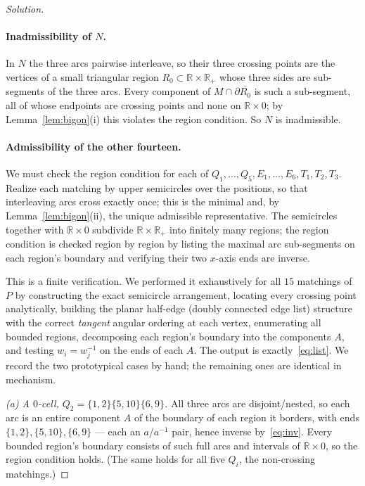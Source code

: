 \documentclass{amsart}
\theoremstyle{definition}
\newcommand{\RR}{\mathbb{R}}
\newcommand{\bdy}{\partial}
\begin{document}
\begin{proof}[Solution]
\paragraph{Inadmissibility of $N$.}
In $N$ the three arcs pairwise interleave, so their three crossing points are the vertices of
a small triangular region $R_0\subset\RR\times\RR_+$ whose three sides are sub-segments of the
three arcs. Every component of $M\cap\bdy\overline{R_0}$ is such a sub-segment, all of whose
endpoints are crossing points and none on $\RR\times0$; by Lemma~\ref{lem:bigon}(i) this
violates the region condition. So $N$ is inadmissible.

\paragraph{Admissibility of the other fourteen.}
We must check the region condition for each of $Q_1,\dots,Q_5,E_1,\dots,E_6,T_1,T_2,T_3$.
Realize each matching by upper semicircles over the positions, so that interleaving arcs cross
exactly once; this is the minimal and, by Lemma~\ref{lem:bigon}(ii), the unique admissible
representative. The semicircles together with $\RR\times0$ subdivide $\RR\times\RR_+$ into
finitely many regions; the region condition is checked region by region by listing the maximal
arc sub-segments on each region's boundary and verifying their two $x$-axis ends are inverse.

This is a finite verification. We performed it exhaustively for all $15$ matchings of $P$ by
constructing the exact semicircle arrangement, locating every crossing point analytically,
building the planar half-edge (doubly connected edge list) structure with the correct
\emph{tangent} angular ordering at each vertex, enumerating all bounded regions, decomposing
each region's boundary into the components $A$, and testing $w_i=w_j^{-1}$ on the ends of each
$A$. The output is exactly~\eqref{eq:list}. We record the two prototypical cases by hand; the
remaining ones are identical in mechanism.

\emph{(a) A $0$-cell, $Q_2=\{1,2\}\{5,10\}\{6,9\}$.} All three arcs are disjoint/nested, so
each arc is an entire component $A$ of the boundary of each region it borders, with ends
$\{1,2\},\{5,10\},\{6,9\}$ --- each an $a$/$a^{-1}$ pair, hence inverse by~\eqref{eq:inv}. Every
bounded region's boundary consists of such full arcs and intervals of $\RR\times0$, so the
region condition holds. (The same holds for all five $Q_i$, the non-crossing matchings.)


\end{proof}
\end{document}

